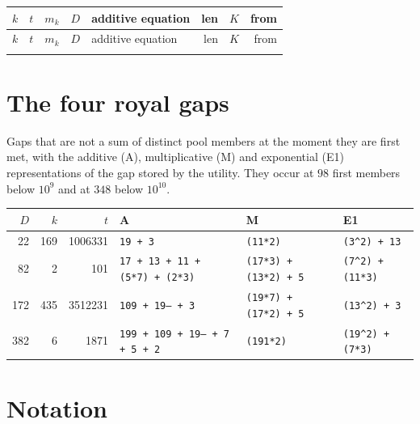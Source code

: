 \documentclass[11pt,a4paper]{article}
\newcommand{\code}[1]{\texttt{#1}}
\begin{document}
\begin{footnotesize}
\begin{longtable}{rrrr>{\raggedright\arraybackslash}p{2.9in}rrr}
\toprule
$k$ & $t$ & $m_k$ & $D$ & additive equation & len & $K$ & from \\
\midrule
\endfirsthead
\toprule
$k$ & $t$ & $m_k$ & $D$ & additive equation & len & $K$ & from \\
\midrule
\endhead
\bottomrule
\endfoot

\end{longtable}
\end{footnotesize}

\section{The four royal gaps}
\label{app:exc}

Gaps that are not a sum of distinct pool members at the moment they are
first met, with the additive (A), multiplicative (M) and exponential (E1)
representations of the gap stored by the utility. They occur at $98$
first members below $10^9$ and at $348$ below $10^{10}$.

\begin{scriptsize}
\setlength{\tabcolsep}{3pt}
\begin{tabular}{rrr>{\raggedright\arraybackslash}p{1.4in}ll}
\toprule
$D$ & $k$ & $t$ & A & M & E1 \\
\midrule
22  & 169 & 1006331 & \code{19 + 3} & \code{(11*2)} & \code{(3\^{}2) + 13} \\
82  & 2   & 101     & \code{17 + 13 + 11 + (5*7) + (2*3)} & \code{(17*3) + (13*2) + 5} & \code{(7\^{}2) + (11*3)} \\
172 & 435 & 3512231 & \code{109 + 19-- + 3} & \code{(19*7) + (17*2) + 5} & \code{(13\^{}2) + 3} \\
382 & 6   & 1871    & \code{199 + 109 + 19-- + 7 + 5 + 2} & \code{(191*2)} & \code{(19\^{}2) + (7*3)} \\
\bottomrule
\end{tabular}
\end{scriptsize}

\section{Notation}
\end{document}
